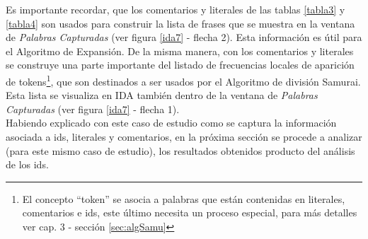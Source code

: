 Es importante recordar, que los comentarios y literales de las tablas \ref{tabla3} y \ref{tabla4} son usados para construir la lista de frases que se muestra en la ventana de \textit{Palabras Capturadas} (ver figura \ref{ida7} - flecha 2). Esta información es útil para el Algoritmo de Expansión. De la misma manera, con los comentarios y literales se construye una parte importante del listado de frecuencias locales de aparición de tokens\footnote[1]{El concepto “token” se asocia a palabras que están contenidas en literales, comentarios e ids, este último necesita un proceso especial, para más detalles ver cap. 3 - sección \ref{sec:algSamu}}, que son destinados a ser usados por el Algoritmo de división Samurai. Esta lista se visualiza en IDA también dentro de la ventana de \textit{Palabras Capturadas} (ver figura \ref{ida7} - flecha 1).\\

Habiendo explicado con este caso de estudio como se captura la información asociada a ids, literales y comentarios, en la próxima sección se procede a analizar (para este mismo caso de estudio), los resultados obtenidos producto del análisis de los ids. 

